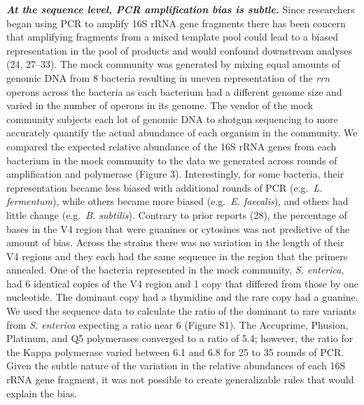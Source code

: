 \documentclass[11pt,]{article}
\begin{document}
\textbf{\emph{At the sequence level, PCR amplification bias is subtle.}}
Since researchers began using PCR to amplify 16S rRNA gene fragments
there has been concern that amplifying fragments from a mixed template
pool could lead to a biased representation in the pool of products and
would confound downstream analyses (24, 27--33). The mock community was
generated by mixing equal amounts of genomic DNA from 8 bacteria
resulting in uneven representation of the \emph{rrn} operons across the
bacteria as each bacterium had a different genome size and varied in the
number of operons in its genome. The vendor of the mock community
subjects each lot of genomic DNA to shotgun sequencing to more
accurately quantify the actual abundance of each organism in the
community. We compared the expected relative abundance of the 16S rRNA
genes from each bacterium in the mock community to the data we generated
across rounds of amplification and polymerase (Figure 3). Interestingly,
for some bacteria, their representation became less biased with
additional rounds of PCR (e.g.~\emph{L. fermentum}), while others became
more biased (e.g.~\emph{E. faecalis}), and others had little change
(e.g.~\emph{B. subtilis}). Contrary to prior reports (28), the
percentage of bases in the V4 region that were guanines or cytosines was
not predictive of the amount of bias. Across the strains there was no
variation in the length of their V4 regions and they each had the same
sequence in the region that the primers annealed. One of the bacteria
represented in the mock community, \emph{S. enterica}, had 6 identical
copies of the V4 region and 1 copy that differed from those by one
nucleotide. The dominant copy had a thymidine and the rare copy had a
guanine. We used the sequence data to calculate the ratio of the
dominant to rare variants from \emph{S. enterica} expecting a ratio near
6 (Figure S1). The Accuprime, Phusion, Platinum, and Q5 polymerases
converged to a ratio of 5.4; however, the ratio for the Kappa polymerase
varied between 6.1 and 6.8 for 25 to 35 rounds of PCR. Given the subtle
nature of the variation in the relative abundances of each 16S rRNA gene
fragment, it was not possible to create generalizable rules that would
explain the bias.
\end{document}
